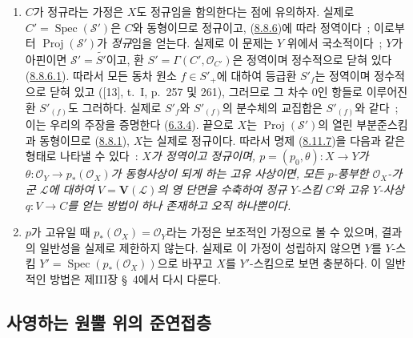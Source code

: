 \begin{remark}[8.11.8]
\label{II.8.11.8-ko}
\begin{enumerate}
  \item[\rm{(i)}] $C$가 정규라는 가정은 $X$도 정규임을 함의한다는 점에
  유의하자. 실제로 $C'=\operatorname{Spec}(\mathcal{S}')$은 $C$와
  동형이므로 정규이고, (\hyperref[II.8.8.6-ko]{8.8.6})에 따라
  정역이다~; 이로부터 $\operatorname{Proj}(\mathcal{S}')$가
  \emph{정규}임을 얻는다. 실제로 이 문제는 $Y$ 위에서 국소적이다~;
  $Y$가 아핀이면 $\mathcal{S}'=\widetilde{S'}$이고, 환
  $S'=\Gamma(C',\mathcal{O}_{C'})$은 정역이며 정수적으로 닫혀 있다
  (\hyperref[II.8.8.6.1-ko]{8.8.6.1}). 따라서 모든 동차 원소
  $f\in S'_+$에 대하여 등급환 $S'_f$는 정역이며 정수적으로 닫혀 있고
  ([13], t.~I, p.~257 및 261), 그러므로 그 차수 0인 항들로 이루어진 환
  $S'_{(f)}$도 그러하다. 실제로 $S'_f$와 $S'_{(f)}$의 분수체의 교집합은
  $S'_{(f)}$와 같다~; 이는 우리의 주장을 증명한다
  (\hyperref[II.6.3.4-ko]{6.3.4}). 끝으로 $X$는
  $\operatorname{Proj}(\mathcal{S}')$의 열린 부분준스킴과 동형이므로
  (\hyperref[II.8.8.1-ko]{8.8.1}), $X$는 실제로 정규이다. 따라서 명제
  (\hyperref[II.8.11.7-ko]{8.11.7})을 다음과 같은 형태로 나타낼 수 있다~:
  \emph{$X$가 정역이고 정규이며,
  $p=(p_0,\theta):X\to Y$가
  $\theta:\mathcal{O}_Y\to p_*(\mathcal{O}_X)$가 동형사상이 되게 하는
  고유 사상이면, 모든 $p$-풍부한 $\mathcal{O}_X$-가군
  $\mathcal{L}$에 대하여 $V=\mathbf{V}(\mathcal{L})$의 영 단면을
  수축하여 정규 $Y$-스킴 $C$와 고유 $Y$-사상 $q:V\to C$를 얻는 방법이
  하나 존재하고 오직 하나뿐이다.}
  \item[\rm{(ii)}] $p$가 고유일 때
  $p_*(\mathcal{O}_X)=\mathcal{O}_Y$라는 가정은 보조적인 가정으로
  볼 수 있으며, 결과의 일반성을 실제로 제한하지 않는다. 실제로 이
  가정이 성립하지 않으면 $Y$를 $Y$-스킴
  $Y'=\operatorname{Spec}(p_*(\mathcal{O}_X))$으로 바꾸고 $X$를
  $Y'$-스킴으로 보면 충분하다. 이 일반적인 방법은 제III장 \S~4에서
  다시 다룬다.
\end{enumerate}
\end{remark}
\subsection{사영하는 원뿔 위의 준연접층}
\label{subsection:II.8.12-ko}

